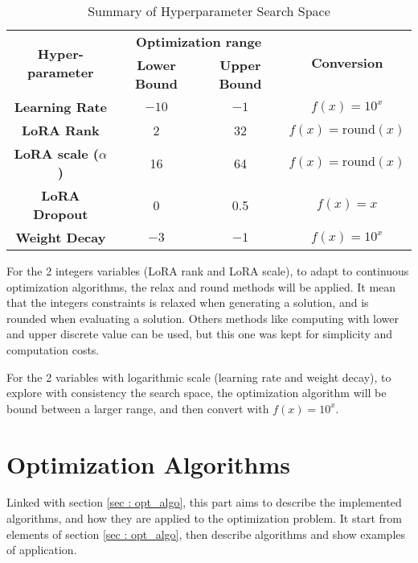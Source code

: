 \begin{table}[h!]
    \centering
    \begin{tabular}{|c|c|c|c|}
        \hline
        \multirow{2}{*}{\textbf{Hyper-parameter}} & \multicolumn{2}{|c|}{\textbf{Optimization range}} & \multirow{2}{*}{\textbf{Conversion}} \\
        \cline{2-3}
         & \textbf{Lower Bound} & \textbf{Upper Bound} &  \\
        \hline
        \textbf{Learning Rate} & $-10$ & $-1$ & $f(x) = 10^{x}$ \\
        \hline
        \textbf{LoRA Rank} & 2 & 32 & $f(x) = \text{round}(x)$ \\
        \hline
        \textbf{LoRA scale ($\alpha$)} & 16 & 64 & $f(x) = \text{round}(x)$ \\
        \hline
        \textbf{LoRA Dropout} & 0 & 0.5 & $f(x) = x$ \\
        \hline
        \textbf{Weight Decay} & $-3$ & $-1$ & $f(x) = 10^{x}$  \\
        \hline
    \end{tabular}
    \caption{Summary of Hyperparameter Search Space}
    \label{tab:hyperparam_table}
\end{table}

For the 2 integers variables (LoRA rank and LoRA scale), to adapt to continuous optimization algorithms, the relax and round methods will be applied. It mean that the integers constraints is relaxed when generating a solution, and is rounded when evaluating a solution. Others methods like computing with lower and upper discrete value can be used, but this one was kept for simplicity and computation costs.

For the 2 variables with logarithmic scale (learning rate and weight decay), to explore with consistency the search space, the optimization algorithm will be bound between a larger range, and then convert with $f(x)=10^{x}$.

\section{Optimization Algorithms}
\label{sec:opt}
Linked with section \ref{sec : opt_algo}, this part aims to describe the implemented algorithms, and how they are applied to the optimization problem. It start from elements of section \ref{sec : opt_algo}, then describe algorithms and show examples of application.

